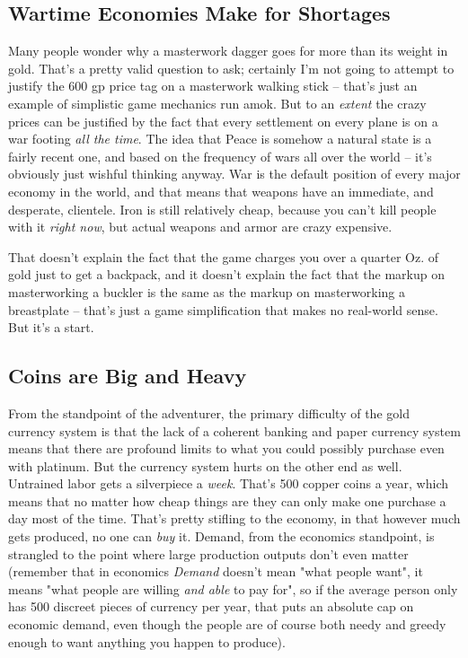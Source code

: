 \subsection{Wartime Economies Make for Shortages}

Many people wonder why a masterwork dagger goes for more than its weight in gold. That's a pretty valid question to ask; certainly I'm not going to attempt to justify the 600 gp price tag on a masterwork walking stick -- that's just an example of simplistic game mechanics run amok. But to an \textit{extent} the crazy prices can be justified by the fact that every settlement on every plane is on a war footing \textit{all the time}. The idea that Peace is somehow a natural state is a fairly recent one, and based on the frequency of wars all over the world -- it's obviously just wishful thinking anyway. War is the default position of every major economy in the world, and that means that weapons have an immediate, and desperate, clientele. Iron is still relatively cheap, because you can't kill people with it \textit{right now}, but actual weapons and armor are crazy expensive.

That doesn't explain the fact that the game charges you over a quarter Oz. of gold just to get a backpack, and it doesn't explain the fact that the markup on masterworking a buckler is the same as the markup on masterworking a breastplate -- that's just a game simplification that makes no real-world sense. But it's a start.

\subsection{Coins are Big and Heavy}

From the standpoint of the adventurer, the primary difficulty of the gold currency system is that the lack of a coherent banking and paper currency system means that there are profound limits to what you could possibly purchase even with platinum. But the currency system hurts on the other end as well. Untrained labor gets a silverpiece a \textit{week}. That's 500 copper coins a year, which means that no matter how cheap things are they can only make one purchase a day most of the time. That's pretty stifling to the economy, in that however much gets produced, no one can \textit{buy} it. Demand, from the economics standpoint, is strangled to the point where large production outputs don't even matter (remember that in economics \textit{Demand} doesn't mean "what people want", it means "what people are willing \textit{and able} to pay for", so if the average person only has 500 discreet pieces of currency per year, that puts an absolute cap on economic demand, even though the people are of course both needy and greedy enough to want anything you happen to produce).

